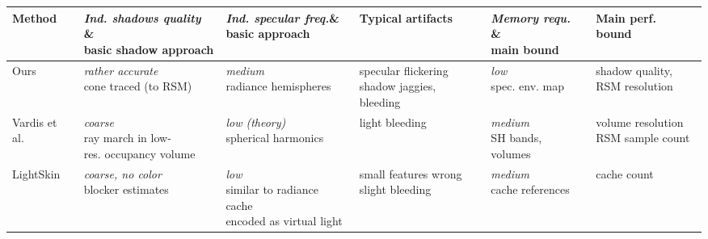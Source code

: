 \documentclass[thesis.tex]{subfiles}
\begin{document}
\begin{landscape}
\newcommand{\specialVspace}{\vspace{0.5cm}}

\begin{table}[h]
\centering
\begin{tabular}{llllll}
\toprule
Method  & \makecell[l]{\emph{Ind. shadows quality} \& \\basic shadow approach} & \makecell[l]{\emph{Ind. specular freq.}\& \\ basic approach} & Typical artifacts & \makecell[l]{\emph{Memory requ.} \&\\ main bound} & Main perf. bound\\
\midrule

\specialVspace

Ours    & \makecell[l]{\emph{rather accurate}\\cone traced (to RSM)}& \makecell[l]{\emph{medium} \\ radiance hemispheres} & \makecell[l]{specular flickering \\ shadow jaggies, bleeding } & \makecell[l]{\emph{low}\\spec. env. map} & \makecell[l]{shadow quality, \\ RSM resolution}\\

\specialVspace

\makecell[l]{Vardis et al. \\ \cite{bib:radiancecachechromaticcompression} } & \makecell[l]{\emph{coarse}\\ray march in low-\\ res. occupancy volume} & \makecell[l]{\emph{low (theory)}\\spherical harmonics} & light bleeding & \makecell[l]{\emph{medium}\\SH bands, volumes} & \makecell[l]{volume resolution\\RSM sample count} \\

\specialVspace

\makecell[l]{LightSkin \\ \cite{bib:LightskinPaper}} & \makecell[l]{\emph{coarse, no color}\\blocker estimates} & \makecell[l]{\emph{low}\\similar to radiance cache\\encoded as virtual light} &  \makecell[l]{small features wrong \\ slight bleeding} & \makecell[l]{\emph{medium}\\cache references} & cache count \\


\end{tabular}
\end{table}
\end{landscape}
\end{document}
